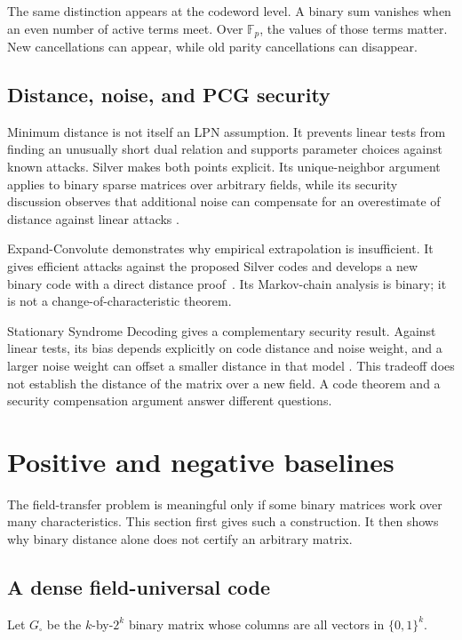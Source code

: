 \documentclass[runningheads,envcountsame,envcountsect]{llncs}
\newcommand{\F}{\mathbb F}
\begin{document}
The same distinction appears at the codeword level.  A binary sum vanishes
when an even number of active terms meet.  Over $\F_p$, the values of those
terms matter.  New cancellations can appear, while old parity cancellations
can disappear.

\subsection{Distance, noise, and PCG security}

Minimum distance is not itself an LPN assumption.  It prevents linear tests
from finding an unusually short dual relation and supports parameter choices
against known attacks.  Silver makes both points explicit.  Its
unique-neighbor argument applies to binary sparse matrices over arbitrary
fields, while its security discussion observes that additional noise can
compensate for an overestimate of distance against linear attacks
\cite{silver21}.

Expand-Convolute demonstrates why empirical extrapolation is insufficient.  It
gives efficient attacks against the proposed Silver codes and develops a new
binary code with a direct distance proof~\cite{ec23}.  Its Markov-chain
analysis is binary; it is not a change-of-characteristic theorem.

Stationary Syndrome Decoding gives a complementary security result.  Against
linear tests, its bias depends explicitly on code distance and noise weight,
and a larger noise weight can offset a smaller distance in that model
\cite{stationary25}.  This tradeoff does not establish the distance of the
matrix over a new field.  A code theorem and a security compensation argument
answer different questions.

\section{Positive and negative baselines}\label{sec:baselines}

The field-transfer problem is meaningful only if some binary matrices work
over many characteristics.  This section first gives such a construction.  It
then shows why binary distance alone does not certify an arbitrary matrix.

\subsection{A dense field-universal code}

Let $G_{\square}$ be the $k$-by-$2^k$ binary matrix whose columns are all
vectors in $\{0,1\}^k$.
\end{document}
